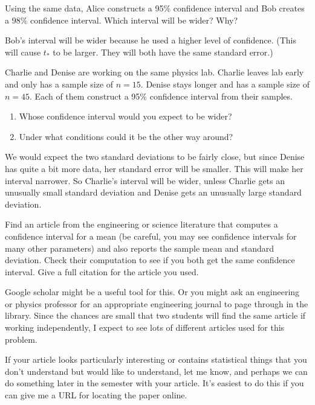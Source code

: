 \documentclass[twoside]{book}\usepackage[]{graphicx}\usepackage[]{xcolor}
\begin{document}
\begin{problem}
	Using the same data, Alice constructs a 95\% confidence interval
	and Bob creates a 98\% confidence interval.  Which interval will be wider?  Why?
\end{problem}

\begin{solution}
	Bob's interval will be wider because he used a higher level of confidence.  (This will
	cause $t_*$ to be larger.  They will both have the same standard error.)
\end{solution}

\begin{problem}
	Charlie and Denise are working on the same physics lab.  Charlie leaves lab early
	and only has a sample size of $n=15$.  Denise stays longer and has a sample
	size of $n=45$.  Each of them construct a 95\% confidence interval from their
	samples.
	\begin{enumerate}
		\item
	Whose confidence interval would you expect to be wider?
\item
	Under what conditions could it be the other way around?
	\end{enumerate}
\end{problem}

\begin{solution}
We would expect the two standard deviations to be fairly close, but since Denise 
has quite a bit more data, her standard error will be smaller.  This will make her
interval narrower.  So Charlie's interval will be wider, unless Charlie gets an unusually 
small standard deviation and Denise gets an unusually large standard deviation.
\end{solution}

\begin{problem}
	Find an article from the engineering or science literature that computes a
	confidence interval for a mean (be careful, you may see confidence intervals
	for many other parameters) and also reports the sample mean and
	standard deviation.  Check their computation to see if you both get the
	same confidence interval.  Give a full citation for the article you used.

	Google scholar might be a useful tool for this.  Or you might ask an
	engineering or physics professor for an appropriate engineering journal to
	page through in the library.  Since the chances are small that two students
	will find the same article if working independently, I expect to see lots
	of different articles used for this problem.

	If your article looks particularly interesting or contains statistical 
	things that you don't understand but would like to understand, let me know,
	and perhaps we can do something later in the semester with your article.
	It's easiest to do this if you can give me a URL for locating the paper online.
\end{problem}
\end{document}
